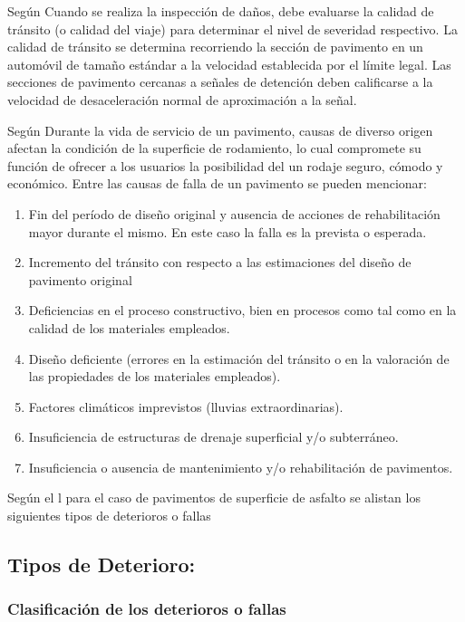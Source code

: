 Según \textcite{Franklin2019} Cuando se realiza la inspección de daños, debe evaluarse la calidad de tránsito (o calidad del viaje) para determinar el nivel de severidad respectivo. La calidad de tránsito se determina recorriendo la sección de pavimento en un automóvil de tamaño estándar a la velocidad establecida por el límite legal. Las secciones de pavimento cercanas a señales de detención deben calificarse a la velocidad de desaceleración normal de aproximación a la señal.

Según \textcite{Evaluacion2009}Durante la vida de servicio de un pavimento, causas de diverso origen afectan la condición de la superficie de rodamiento, lo cual compromete su función de ofrecer a los usuarios la posibilidad del un rodaje seguro, cómodo y económico. Entre las causas de falla de un pavimento se
pueden mencionar:
\begin{enumerate}
	\item Fin del período de diseño original y ausencia de acciones de rehabilitación mayor durante el mismo. En este caso la falla es la prevista o esperada.
	\item  Incremento del tránsito con respecto a las estimaciones del diseño de pavimento 	original
	\item Deficiencias en el proceso constructivo, bien en procesos como tal como en la calidad de los materiales empleados.
	\item Diseño deficiente (errores en la estimación del tránsito o en la valoración de las propiedades de los materiales empleados).
	\item Factores climáticos imprevistos (lluvias extraordinarias).
	\item Insuficiencia de estructuras de drenaje superficial y/o subterráneo.
	\item Insuficiencia o ausencia de mantenimiento y/o rehabilitación de pavimentos.
\end{enumerate}
\vspace{0.5cm}
\noindent Según el \textcite{ManualCarreteras2018}l para el caso de pavimentos de superficie de asfalto se alistan los siguientes tipos de deterioros o fallas
\subsection{Tipos de Deterioro:}
\subsubsection{Clasificación de los deterioros o fallas}

